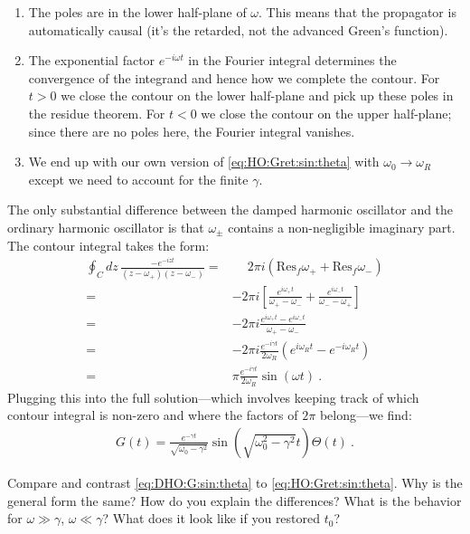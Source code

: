  \begin{enumerate}
 \item The poles are in the lower half-plane of $\omega$. This means that the propagator is automatically causal (it's the retarded, not the advanced Green's function).
 \item The exponential factor $e^{-i\omega t}$ in the Fourier integral determines the convergence of the integrand and hence how we complete the contour. For $t>0$ we close the contour on the lower half-plane and pick up these poles in the residue theorem. For $t<0$ we close the contour on the upper half-plane; since there are no poles here, the Fourier integral vanishes.
 \item We end up with our own version of \eqref{eq:HO:Gret:sin:theta} with $\omega_0\to\omega_R$ except we need to account for the finite $\gamma$. 
 \end{enumerate}
 The only substantial difference between the damped harmonic oscillator and the ordinary harmonic oscillator is that $\omega_\pm$ contains a non-negligible imaginary part. The contour integral takes the form:
 \begin{align}
  \oint_C dz \,
  \frac{-e^{-izt}}{
  \left(z-\omega_+\right)
  \left(z-\omega_-\right)
  }
  =&
  \phantom+ 
  2\pi i\left(\text{Res}_f\omega_+ + \text{Res}_f\omega_-\right)
  \\
  =&
  -2\pi i\left[
  \frac{e^{i\omega_+t}}{\omega_+-\omega_-}
  +
  \frac{e^{i\omega_-t}}{\omega_--\omega_+}
  \right]
  \\
  =&
  -2\pi i
  \frac{e^{i\omega_+t} - e^{i\omega_-t}}{\omega_+-\omega_-}
  \\
  =&
  -2\pi i \frac{e^{-i\gamma t}}{2\omega_R}
  \left(e^{i\omega_Rt} - e^{-i\omega_Rt}\right)
  \\
  =&
  \pi \frac{e^{-i\gamma t}}{2\omega_R}
  \sin(\omega t)
   \ .
 \end{align}
 Plugging this into the full solution---which involves keeping track of which contour integral is non-zero and where the factors of $2\pi$ belong---we find:
 \begin{align}
  G(t) = \frac{e^{-\gamma t}}{\sqrt{\omega_0-\gamma^2}} \sin\left(\sqrt{\omega_0^2-\gamma^2} t\right) \Theta(t) \ .
  \label{eq:DHO:G:sin:theta}
 \end{align} 
 \begin{exercise}
Compare and contrast \eqref{eq:DHO:G:sin:theta} to \eqref{eq:HO:Gret:sin:theta}. Why is the general form the same? How do you explain the differences? What is the behavior for $\omega \gg \gamma$, $\omega \ll \gamma$? What does it look like if you restored $t_0$?
 \end{exercise}
